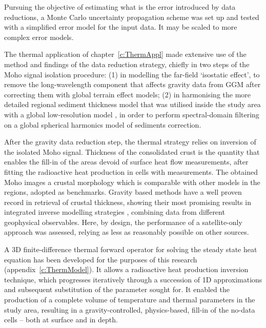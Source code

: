 Pursuing the objective of estimating what is the error introduced by data reductions, a Monte Carlo uncertainty propagation scheme was set up and tested with a simplified error model for the input data.
It may be scaled to more complex error models.

The thermal application of chapter~\ref{c:ThermAppl} made extensive use of the method and findings of the data reduction strategy, chiefly in two steps of the Moho signal isolation procedure:
(1) in modelling the far-field `isostatic effect', to remove the long-wavelength component that affects gravity data from GGM after correcting them with global terrain effect models; (2) in harmonising the more detailed regional sediment thickness model that was utilised inside the study area \parencite[{EuCRUST},][]{Tesauro2008} with a global low-resolution model \parencite[{LITHO1.0},][]{Pasyanos2014}, in order to perform spectral-domain filtering on a global spherical harmonics model of sediments correction.

After the gravity data reduction step, the thermal strategy relies on inversion of the isolated Moho signal.
Thickness of the consolidated crust is the quantity that enables the fill-in of the areas devoid of surface heat flow measurements, after fitting the radioactive heat production in cells with measurements.
The obtained Moho images a crustal morphology which is comparable with other models in the regions, adopted as benchmarks.
Gravity based methods have a well proven record in retrieval of crustal thickness, showing their most promising results in integrated inverse modelling strategies \parencites[e.g.][]{Eshagh2011}{Reguzzoni2015}, combining data from different geophysical observables.
Here, by design, the performance of a satellite-only approach was assessed, relying as less as reasonably possible on other sources.

A 3D finite-difference thermal forward operator for solving the steady state heat equation has been developed for the purposes of this research (appendix~\ref{c:ThermModel}).
It allows a radioactive heat production inversion technique, which progresses iteratively through a succession of 1D approximations and subsequent substitution of the parameter sought for.
It enabled the production of a complete volume of temperature and thermal parameters in the study area, resulting in a gravity-controlled, physics-based, fill-in of the no-data cells -- both at surface and in depth.
\\

